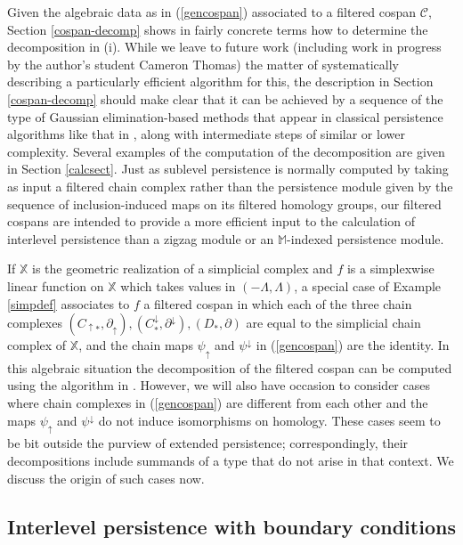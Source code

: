 \documentclass[11pt]{amsart}
\theoremstyle{definition}
\theoremstyle{remark}
\numberwithin{equation}{section}
\begin{document}
Given the algebraic data as in (\ref{gencospan}) associated to a filtered cospan $\mathcal{C}$, Section \ref{cospan-decomp} shows in fairly concrete terms how to determine the decomposition in (i).  While we leave to future work (including work in progress by the author's student Cameron Thomas) the matter of systematically describing a particularly efficient algorithm for this, the description in Section \ref{cospan-decomp} should make  clear that it can be achieved by a sequence of the type of Gaussian elimination-based methods that appear in classical persistence algorithms like that in \cite{ZC}, along with intermediate steps of similar or lower complexity.  Several examples of the computation of the decomposition are given in Section \ref{calcsect}. Just as sublevel persistence is normally computed by taking as input a filtered chain complex rather than the persistence module given by the sequence of inclusion-induced maps on its filtered homology groups, our filtered cospans are intended to provide a more efficient input to the calculation of interlevel persistence than a zigzag module or an $\mathbb{M}$-indexed persistence module. 

If $\mathbb{X}$ is the geometric realization of a simplicial complex and $f$ is a simplexwise linear function on $\mathbb{X}$ which takes values in $(-\Lambda,\Lambda)$, a special case of Example \ref{simpdef} associates to $f$ a filtered cospan in which each of the three chain complexes $(C_{\uparrow *},\partial_{\uparrow}),(C^{\downarrow}_{*},\partial^{\downarrow}),(D_*,\partial)$ are   equal to the simplicial chain complex of $\mathbb{X}$, and the chain maps $\psi_{\uparrow}$ and $\psi^{\downarrow}$ in (\ref{gencospan}) are the identity.  In this algebraic situation the decomposition of the filtered cospan can be computed using the algorithm in \cite[Section 6]{CEH09}.  However, we will also have occasion to consider cases where chain complexes in (\ref{gencospan}) are different from each other and the maps $\psi_{\uparrow}$ and $\psi^{\downarrow}$ do not induce isomorphisms on homology.  These cases seem to be bit outside the purview of extended persistence; correspondingly, their decompositions include summands of a type that do not arise in that context.  We discuss the origin of such cases now.

\subsection{Interlevel persistence with boundary conditions}
\end{document}
